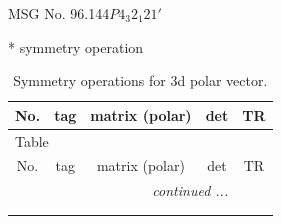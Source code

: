 \documentclass[fleqn,8pt]{jsarticle}
\begin{document}
\setcounter{MaxMatrixCols}{32}

\renewcommand{\tablename}{Table~}
\renewcommand{\figurename}{Figure~}
\begin{center}
\LARGE
MSG No. 96.144\quad$P4_{3}2_{1}21'$
\end{center}
* symmetry operation
\renewcommand{\arraystretch}{1.3}
\begin{longtable}{ccccc}
\caption{Symmetry operations for 3d polar vector.}
 \\
 \hline \hline
No. & tag & matrix (polar) & det & TR \\ \hline \endfirsthead

\multicolumn{4}{l}{\tablename\ \thetable{}} \\
 \hline \hline
No. & tag & matrix (polar) & det & TR \\ \hline \endhead

 \hline \hline
\multicolumn{4}{r}{\footnotesize\it continued ...} \\ \endfoot

 \hline \hline
\multicolumn{4}{r}{} \\ \endlastfoot


\end{longtable}
\end{document}
